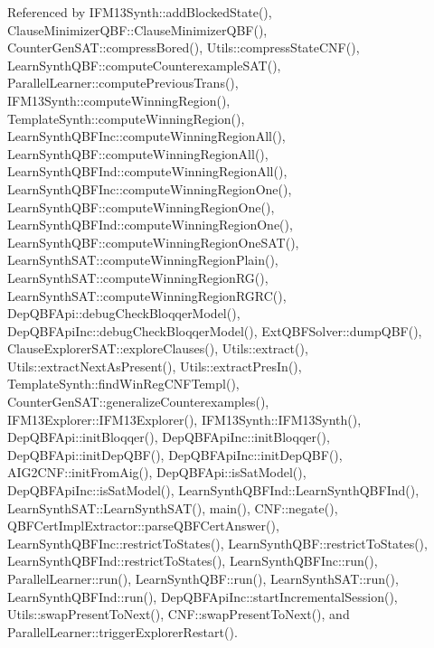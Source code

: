 Referenced by I\-F\-M13\-Synth\-::add\-Blocked\-State(), Clause\-Minimizer\-Q\-B\-F\-::\-Clause\-Minimizer\-Q\-B\-F(), Counter\-Gen\-S\-A\-T\-::compress\-Bored(), Utils\-::compress\-State\-C\-N\-F(), Learn\-Synth\-Q\-B\-F\-::compute\-Counterexample\-S\-A\-T(), Parallel\-Learner\-::compute\-Previous\-Trans(), I\-F\-M13\-Synth\-::compute\-Winning\-Region(), Template\-Synth\-::compute\-Winning\-Region(), Learn\-Synth\-Q\-B\-F\-Inc\-::compute\-Winning\-Region\-All(), Learn\-Synth\-Q\-B\-F\-::compute\-Winning\-Region\-All(), Learn\-Synth\-Q\-B\-F\-Ind\-::compute\-Winning\-Region\-All(), Learn\-Synth\-Q\-B\-F\-Inc\-::compute\-Winning\-Region\-One(), Learn\-Synth\-Q\-B\-F\-::compute\-Winning\-Region\-One(), Learn\-Synth\-Q\-B\-F\-Ind\-::compute\-Winning\-Region\-One(), Learn\-Synth\-Q\-B\-F\-::compute\-Winning\-Region\-One\-S\-A\-T(), Learn\-Synth\-S\-A\-T\-::compute\-Winning\-Region\-Plain(), Learn\-Synth\-S\-A\-T\-::compute\-Winning\-Region\-R\-G(), Learn\-Synth\-S\-A\-T\-::compute\-Winning\-Region\-R\-G\-R\-C(), Dep\-Q\-B\-F\-Api\-::debug\-Check\-Bloqqer\-Model(), Dep\-Q\-B\-F\-Api\-Inc\-::debug\-Check\-Bloqqer\-Model(), Ext\-Q\-B\-F\-Solver\-::dump\-Q\-B\-F(), Clause\-Explorer\-S\-A\-T\-::explore\-Clauses(), Utils\-::extract(), Utils\-::extract\-Next\-As\-Present(), Utils\-::extract\-Pres\-In(), Template\-Synth\-::find\-Win\-Reg\-C\-N\-F\-Templ(), Counter\-Gen\-S\-A\-T\-::generalize\-Counterexamples(), I\-F\-M13\-Explorer\-::\-I\-F\-M13\-Explorer(), I\-F\-M13\-Synth\-::\-I\-F\-M13\-Synth(), Dep\-Q\-B\-F\-Api\-::init\-Bloqqer(), Dep\-Q\-B\-F\-Api\-Inc\-::init\-Bloqqer(), Dep\-Q\-B\-F\-Api\-::init\-Dep\-Q\-B\-F(), Dep\-Q\-B\-F\-Api\-Inc\-::init\-Dep\-Q\-B\-F(), A\-I\-G2\-C\-N\-F\-::init\-From\-Aig(), Dep\-Q\-B\-F\-Api\-::is\-Sat\-Model(), Dep\-Q\-B\-F\-Api\-Inc\-::is\-Sat\-Model(), Learn\-Synth\-Q\-B\-F\-Ind\-::\-Learn\-Synth\-Q\-B\-F\-Ind(), Learn\-Synth\-S\-A\-T\-::\-Learn\-Synth\-S\-A\-T(), main(), C\-N\-F\-::negate(), Q\-B\-F\-Cert\-Impl\-Extractor\-::parse\-Q\-B\-F\-Cert\-Answer(), Learn\-Synth\-Q\-B\-F\-Inc\-::restrict\-To\-States(), Learn\-Synth\-Q\-B\-F\-::restrict\-To\-States(), Learn\-Synth\-Q\-B\-F\-Ind\-::restrict\-To\-States(), Learn\-Synth\-Q\-B\-F\-Inc\-::run(), Parallel\-Learner\-::run(), Learn\-Synth\-Q\-B\-F\-::run(), Learn\-Synth\-S\-A\-T\-::run(), Learn\-Synth\-Q\-B\-F\-Ind\-::run(), Dep\-Q\-B\-F\-Api\-Inc\-::start\-Incremental\-Session(), Utils\-::swap\-Present\-To\-Next(), C\-N\-F\-::swap\-Present\-To\-Next(), and Parallel\-Learner\-::trigger\-Explorer\-Restart().

